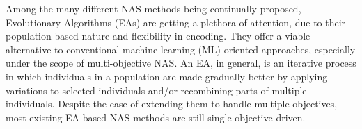 \documentclass[journal]{IEEEtran}
\theoremstyle{definition}
\theoremstyle{remark}
\def\sota{state-of-the-art}
\begin{document}
\begin{comment}
with different complexities for different deployment scenarios---e.g., IoT systems, mobile devices, automotives, cloud servers, etc. These computing devices are often constrained by a variety of hardware resources, such as power consumption, available memory, and latency constraints, to name a few. Even though there are methods with more advanced techniques like weight sharing \cite{pmlr-v80-pham18a} to improve RL's search efficiency, and binary gating \cite{cai2018proxylessnas} to reduce the GPU memory footprint of relaxation-based methods, most existing RL and relaxation-based methods are not readily applicable for multi-objective NAS.
\end{comment}

{Among the many different NAS methods being continually proposed, Evolutionary Algorithms (EAs) are getting a plethora of attention,} due to their population-based nature and flexibility in encoding.  They offer a viable alternative to conventional machine learning (ML)-oriented approaches, especially under the scope of multi-objective NAS. An EA, in general, is an iterative process in which individuals in a population are made gradually better by applying variations to selected individuals and/or recombining parts of multiple individuals. Despite the ease of  extending them to handle multiple objectives, most existing EA-based NAS methods \cite{genetic-cnn,real2017largescale,liu2018hierarchical,real2019regularized,ae-cnn,ae-cnn-e2epp} are still single-objective driven. 

\begin{comment}
Even under the explosive growth of general interest in NAS, EA-based NAS approaches have not been well perceived outside the EA community, primarily due to the following two reasons: (i) existing EA-based methods \cite{liu2018hierarchical,real2019regularized} that produce competitive results are extremely computationally inefficient (e.g., one run of \cite{real2019regularized} takes 7 days on 450 GPUs); or (ii) results from existing EA-based methods \cite{genetic-cnn,cgp-cnn,ae-cnn,ae-cnn-e2epp} that use limited search budgets are far from \sota{} performance and only demonstrated on small-scale datasets. 
\end{comment}
\end{document}
